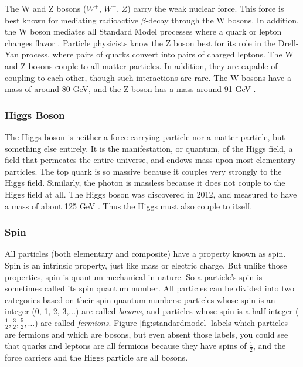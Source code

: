 The W and Z bosons ($W^+$, $W^-$, $Z$) carry the weak nuclear force. This
force is best known for mediating radioactive $\beta$-decay through
the W bosons. In addition, the W boson mediates all Standard Model
processes where a quark or lepton changes flavor \cite{griffiths}.
Particle physicists know the Z boson best for its
role in the Drell-Yan process, where pairs of quarks convert into
pairs of charged leptons. The W and Z bosons couple to all matter
particles. In addition, they are capable of coupling to each other,
though such interactions are rare. The W bosons have a mass of around
80 GeV, and the Z boson has a mass around 91 GeV \cite{pdg}.

\subsubsection*{Higgs Boson}
The Higgs boson is neither a force-carrying particle nor a matter particle, but
something else entirely. It is the manifestation, or quantum, of the
Higgs field, a field that permeates the entire universe, and endows
mass upon most elementary particles. The top quark is so massive
because it couples very strongly to the Higgs field. Similarly, the
photon is massless because it does not couple to the Higgs field at all.
The Higgs boson was discovered in 2012, and measured to have a mass
of about 125 GeV \cite{jointhiggs}. Thus the Higgs must also couple to itself.

\subsubsection*{Spin}
All particles (both elementary and composite) have
a property known as spin. Spin is an intrinsic property, just like
mass or electric charge. But unlike those properties, spin is quantum
mechanical in nature. So a particle's spin is sometimes called its
spin quantum number. All particles can be divided into two categories
based on their spin quantum numbers: particles whose spin is an
integer (0, 1, 2, 3,$\ldots$) are called \emph{bosons}, and particles whose
spin is a half-integer ($\frac{1}{2}, \frac{3}{2}, \frac{5}{2},\ldots$)
are called \emph{fermions}. Figure \ref{fig:standardmodel}
labels which particles are fermions and which are bosons, but even
absent those labels, you could see that quarks and leptons are all
fermions because they have spins of $\frac{1}{2}$, and the force
carriers and the Higgs particle are all bosons.

